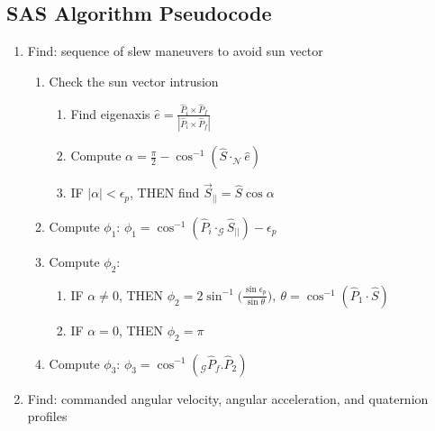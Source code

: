\documentclass[letterpaper, preprint, paper,11pt]{AAS}	%
\begin{document}
	\subsection{SAS Algorithm Pseudocode}
	
	\begin{enumerate}
		
		\item Find: sequence of slew maneuvers to avoid sun vector 
		
		\begin{enumerate}
			
			\item Check the sun vector intrusion 
			
			\begin{enumerate}
				\item Find eigenaxis $
				\hat{e}=\frac{\hat{P}_i\times\hat{P}_f}{|\hat{P}_i\times \hat{P}_f|}
				$
				\item Compute $
				\alpha=\frac{\pi}{2}-\cos^{-1}(\hat{S}\cdot_\mathcal{N}\hat{e})
				$
				\item IF $|\alpha|<\epsilon_p$, THEN find 
				$
				\vec{S}_{||}=\hat{S}\cos\alpha
				$
			\end{enumerate}
			
			\item Compute $\phi_1$:
			$
			\phi_1 = \cos^{-1}(\hat{P}_i\cdot_\mathcal{G}\hat{S}_{||})-\epsilon_p
			$
			
			\item Compute $\phi_2$:
			
			\begin{enumerate}
				\item IF $\alpha \neq 0$, THEN
				$
				\phi_2 = 2\sin^{-1}\Big( \frac{ \sin\epsilon_p}{\sin \theta}\Big),\ \theta=\cos^{-1}(\hat{P}_1\cdot\hat{S})
				$
				
				\item IF $\alpha = 0$, THEN
				$
				\phi_2 = \pi
				$
				
			\end{enumerate}
			
			\item Compute $\phi_3$:
			$
			\phi_3 = \cos^{-1}(_\mathcal{G}\hat{P}_f.\hat{P}_2)
			$
			
		\end{enumerate}
		
		\item Find: commanded angular velocity, angular acceleration, and quaternion profiles 
		

\end{enumerate}
\end{document}
